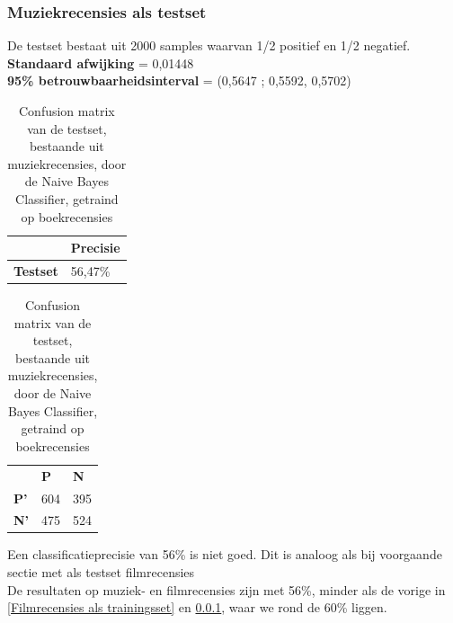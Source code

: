 \begin{appendices}
\subsubsection{Muziekrecensies als testset}\label{Muziekrecensies als testset}

De testset bestaat uit 2000 samples waarvan 1/2 positief en 1/2 negatief.\\
\textbf{Standaard afwijking} = 0,01448\\
\textbf{95\% betrouwbaarheidsinterval} = (0,5647 ; 0,5592, 0,5702)

\begin{table}[h]
\centering
\setlength\tabcolsep{4pt}
\begin{minipage}[t!]{0.48\textwidth}
\centering
\begin{tabular}{l|l|}
\cline{2-2}
                                            & \textbf{Precisie} \\ \hline
\multicolumn{1}{|l|}{\textbf{Testset}}      & 56,47\%           \\ \hline
\end{tabular}
\caption{Classificatieprecisie Naive Bayes Classifier, getraind op boekrecensies, getest op muziekrecensies}
\end{minipage}%
\hfill
\begin{minipage}[t!]{0.48\textwidth}
\centering
\begin{tabular}{lll}
                                 & \textbf{P}               & \textbf{N}               \\ \cline{2-3} 
\multicolumn{1}{l|}{\textbf{P'}} & \multicolumn{1}{l|}{604} & \multicolumn{1}{l|}{395} \\ \cline{2-3} 
\multicolumn{1}{l|}{\textbf{N'}} & \multicolumn{1}{l|}{475} & \multicolumn{1}{l|}{524} \\ \cline{2-3} 
\end{tabular}
\caption{Confusion matrix van de testset, bestaande uit muziekrecensies, door de  Naive Bayes Classifier, getraind op boekrecensies} 
\end{minipage}
\end{table}

Een classificatieprecisie van 56\% is niet goed. Dit is analoog als bij voorgaande sectie met als testset filmrecensies\\

De resultaten op muziek- en filmrecensies zijn met 56\%, minder als de vorige in \ref{Filmrecensies als trainingsset} en \ref{Muziekrecensies als testset}, waar we rond de 60\% liggen.


\end{appendices}
